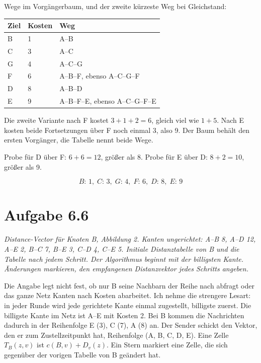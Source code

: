 \documentclass[a4paper,11pt]{article}
\newif\ifexplain
\newcommand{\aufgabe}[1]{\section*{Aufgabe #1}}
\newcommand{\angabe}[1]{{\raggedright\textit{#1}\par}\smallskip}
\newcommand{\explain}[1]{\ifexplain\begin{erklbox}#1\end{erklbox}\fi}
\newcommand{\explainfig}[1]{\ifexplain\begin{center}#1\end{center}\fi}
\begin{document}
Wege im Vorgängerbaum, und der zweite kürzeste Weg bei Gleichstand:
\begin{center}
\begin{tabular}{@{}lll@{}}
\toprule
Ziel & Kosten & Weg \\
\midrule
B & 1 & A--B \\
C & 3 & A--C \\
G & 4 & A--C--G \\
F & 6 & A--B--F, ebenso A--C--G--F \\
D & 8 & A--B--D \\
E & 9 & A--B--F--E, ebenso A--C--G--F--E \\
\bottomrule
\end{tabular}
\end{center}
Die zweite Variante nach F kostet \(3+1+2=6\), gleich viel wie \(1+5\). Nach E kosten beide Fortsetzungen über F noch einmal 3, also 9. Der Baum behält den ersten Vorgänger, die Tabelle nennt beide Wege.

Probe für D über F: \(6+6=12\), größer als 8. Probe für E über D: \(8+2=10\), größer als 9.

\explain{Dijkstra nimmt immer den noch nicht festen Knoten mit der kleinsten Distanz. Deshalb kommt G vor F, obwohl F schon einen Wert hat: 4 ist kleiner als 6. Bei Gleichstand nicht umschreiben, sonst hängt der Vorgänger von der Kantenreihenfolge ab und zwei korrekte Läufe sehen verschieden aus. Die Kosten bleiben trotzdem gleich.}
\[\boxed{B{:}\,1,\; C{:}\,3,\; G{:}\,4,\; F{:}\,6,\; D{:}\,8,\; E{:}\,9}\]

\aufgabe{6.6}
\angabe{Distance-Vector für Knoten B, Abbildung 2. Kanten ungerichtet: A--B 8, A--D 12, A--E 2, B--C 7, B--E 3, C--D 4, C--E 5. Initiale Distanztabelle von B und die Tabelle nach jedem Schritt. Der Algorithmus beginnt mit der billigsten Kante. Änderungen markieren, den empfangenen Distanzvektor jedes Schritts angeben.}
\explainfig{%
\begin{tikzpicture}[every node/.style={circle,draw,minimum size=7mm,inner sep=0pt}]
  \node (D) at (0,2.2) {D};
  \node (C) at (3.2,2.2) {C};
  \node (A) at (0,0) {A};
  \node (E) at (3.2,0) {E};
  \node (B) at (1.6,1.0) {B};
  \draw (D) -- node[draw=none,fill=white,inner sep=1pt] {4} (C);
  \draw (D) -- node[draw=none,fill=white,inner sep=1pt] {12} (A);
  \draw (A) -- node[draw=none,fill=white,inner sep=1pt] {2} (E);
  \draw (C) -- node[draw=none,fill=white,inner sep=1pt] {5} (E);
  \draw (A) -- node[draw=none,fill=white,inner sep=1pt] {8} (B);
  \draw (B) -- node[draw=none,fill=white,inner sep=1pt] {7} (C);
  \draw (B) -- node[draw=none,fill=white,inner sep=1pt] {3} (E);
\end{tikzpicture}}
Die Angabe legt nicht fest, ob nur B seine Nachbarn der Reihe nach abfragt oder das ganze Netz Kanten nach Kosten abarbeitet. Ich nehme die strengere Lesart: in jeder Runde wird jede gerichtete Kante einmal zugestellt, billigste zuerst. Die billigste Kante im Netz ist A--E mit Kosten 2. Bei B kommen die Nachrichten dadurch in der Reihenfolge E (3), C (7), A (8) an. Der Sender schickt den Vektor, den er zum Zustellzeitpunkt hat, Reihenfolge (A, B, C, D, E). Eine Zelle \(T_B(z,v)\) ist \(c(B,v)+D_v(z)\). Ein Stern markiert eine Zelle, die sich gegenüber der vorigen Tabelle von B geändert hat.
\end{document}
